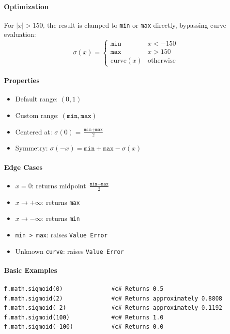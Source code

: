 \paragraph{Optimization}
For $|x| > 150$, the result is clamped to \texttt{min} or \texttt{max} directly, bypassing curve evaluation:
\[
\sigma(x) = \begin{cases} \texttt{min} & x < -150 \\ \texttt{max} & x > 150 \\ \text{curve}(x) & \text{otherwise} \end{cases}
\]

\paragraph{Properties}
\begin{itemize}
\item Default range: $(0, 1)$
\item Custom range: $(\texttt{min}, \texttt{max})$
\item Centered at: $\sigma(0) = \frac{\texttt{min} + \texttt{max}}{2}$
\item Symmetry: $\sigma(-x) = \texttt{min} + \texttt{max} - \sigma(x)$
\end{itemize}

\paragraph{Edge Cases}
\begin{itemize}
\item $x = 0$: returns midpoint $\frac{\texttt{min} + \texttt{max}}{2}$
\item $x \to +\infty$: returns \texttt{max}
\item $x \to -\infty$: returns \texttt{min}
\item \texttt{min > max}: raises \texttt{Value Error}
\item Unknown \texttt{curve}: raises \texttt{Value Error}
\end{itemize}

\paragraph{Basic Examples}
\begin{verbatim}
f.math.sigmoid(0)              #c# Returns 0.5
f.math.sigmoid(2)              #c# Returns approximately 0.8808
f.math.sigmoid(-2)             #c# Returns approximately 0.1192
f.math.sigmoid(100)            #c# Returns 1.0
f.math.sigmoid(-100)           #c# Returns 0.0
\end{verbatim}

